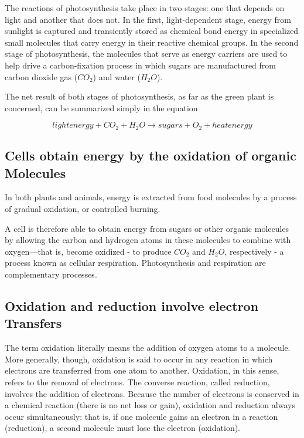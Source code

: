 The reactions of photosynthesis take place in two stages: one that
depends on light and another that does not. In the first, light-dependent
stage, energy from sunlight is captured and transiently stored
as chemical bond energy in specialized small molecules that carry energy
in their reactive chemical groups.
In the second stage of photosynthesis, the molecules that serve as energy
carriers are used to help drive a carbon-fixation process in which sugars
are manufactured from carbon dioxide gas ($CO_{2}$) and water ($H_{2}O$).

The net result of both stages of photosynthesis, as far as the green plant
is concerned, can be summarized simply in the equation

\begin{equation}
light energy + CO_{2} + H_{2}O \rightarrow sugars + O_{2} + heat energy
\end{equation}

\subsection{Cells obtain energy by the oxidation of organic Molecules}

In both plants and
animals, energy is extracted from food molecules by a process of gradual
oxidation, or controlled burning.

A cell is therefore able to obtain energy from sugars or other
organic molecules by allowing the carbon and hydrogen atoms in these
molecules to combine with oxygen—that is, become oxidized - to produce
$CO_{2}$ and $H_{2}O$, respectively - a process known as cellular respiration.
Photosynthesis and respiration are complementary processes.

\subsection{Oxidation and reduction involve electron Transfers}

The term oxidation literally means the addition of oxygen atoms to a
molecule. More generally, though, oxidation is said to occur in any
reaction in which electrons are transferred from one atom to another.
Oxidation, in this sense, refers to the removal of electrons. The converse
reaction, called reduction, involves the addition of electrons.
Because the
number of electrons is conserved in a chemical reaction (there is no net
loss or gain), oxidation and reduction always occur simultaneously: that
is, if one molecule gains an electron in a reaction (reduction), a second
molecule must lose the electron (oxidation).

